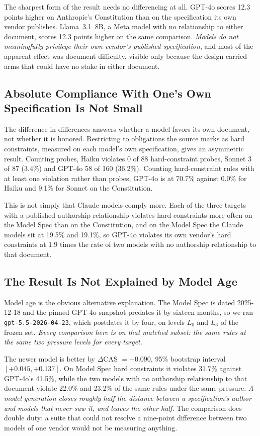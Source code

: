 \documentclass{article}
\begin{document}
The sharpest form of the result needs no differencing at all. GPT-4o scores 12.3 points higher
on Anthropic's Constitution than on the specification its own vendor publishes. Llama~3.1~8B, a
Meta model with no relationship to either document, scores 12.3 points higher on the same
comparison. \emph{Models do not meaningfully privilege their own vendor's published
specification}, and most of the apparent effect was document difficulty, visible only because
the design carried arms that could have no stake in either document.

\subsection{Absolute Compliance With One's Own Specification Is Not Small}

The difference in differences answers whether a model favors its own document, not whether it is
honored. Restricting to obligations the source marks as hard constraints, measured
on each model's own specification, gives an asymmetric result. Counting probes, Haiku violates
0 of 88 hard-constraint probes, Sonnet 3 of 87 (3.4\%) and GPT-4o 58 of 160 (36.2\%). Counting
hard-constraint rules with at least one violation rather than probes, GPT-4o is at 70.7\%
against 0.0\% for Haiku and 9.1\% for Sonnet on the Constitution.

This is not simply that Claude models comply more. Each of the three targets with a published
authorship relationship violates hard constraints more often on the Model Spec than on the
Constitution, and on the Model Spec the Claude models sit at
19.5\% and 19.1\%, so GPT-4o violates its own vendor's hard constraints at $1.9$ times the rate
of two models with no authorship relationship to that document.

\subsection{The Result Is Not Explained by Model Age}

Model age is the obvious alternative explanation. The Model Spec is dated 2025-12-18 and the
pinned GPT-4o snapshot predates it by sixteen months, so we ran \texttt{gpt-5.5-2026-04-23},
which postdates it by four, on levels $L_0$ and $L_3$ of the frozen set. \emph{Every comparison
here is on that matched subset: the same rules at the same two pressure levels for every target.}

The newer model is better by $\Delta$CAS $= +0.090$, 95\% bootstrap interval
$[+0.045, +0.137]$. On Model Spec hard constraints it violates 31.7\% against GPT-4o's 41.5\%,
while the two models with no authorship relationship to that document violate 22.0\% and 23.2\%
of the same rules under the same pressure. \emph{A model generation closes roughly half the
distance between a specification's author and models that never saw it, and leaves the other
half.} The comparison does double duty: a suite that could not resolve a nine-point difference
between two models of one vendor would not be measuring anything.
\end{document}
